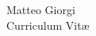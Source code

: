 \documentclass[10pt]{article} %
\begin{document}
\vspace*{0.6\baselineskip}

\begin{paracol}{2} %


\parbox[top][0.12\textheight][c]{\linewidth}{ %
	\vspace{-0.04\textheight} %
	\centering %
    {\sffamily\Huge Matteo Giorgi}\\
    {\Large\color{headings} Curriculum Vit\ae}
}


%
%
%
%
%
%
%


\end{paracol}
\end{document}
